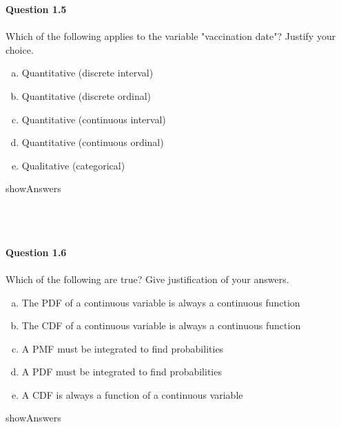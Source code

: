 \documentclass{article}
\begin{document}
%
%
{\bf Question 1.5}
~\\~\\
Which of the following applies to the variable "vaccination date"? Justify your choice. 
\begin{enumerate}[(a)]
    \item Quantitative (discrete interval)
    \item Quantitative (discrete ordinal)
    \item Quantitative (continuous interval)
    \item Quantitative (continuous ordinal)
    \item Qualitative (categorical)
\end{enumerate}
\begin{maybePrint}{showAnswers}
~\\~\\
~\\~\\
\end{maybePrint}
%
%
{\bf Question 1.6}
~\\~\\
Which of the following are true? Give justification of your answers. 
\begin{enumerate}[(a)]
    \item The PDF of a continuous variable is always a continuous function
    \item The CDF of a continuous variable is always a continuous function
    \item A PMF must be integrated to find probabilities
    \item A PDF must be integrated to find probabilities
    \item A CDF is always a function of a continuous variable
\end{enumerate}
\begin{maybePrint}{showAnswers}
~\\~\\
~\\~\\
\end{maybePrint}
\end{document}
